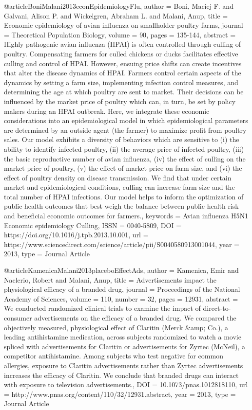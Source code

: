 @article{BoniMalani2013econEpidemiologyFlu,
   author = {Boni, Maciej F. and Galvani, Alison P. and Wickelgren, Abraham L. and Malani, Anup},
   title = {Economic epidemiology of avian influenza on smallholder poultry farms},
   journal = {Theoretical Population Biology},
   volume = {90},
   pages = {135-144},
   abstract = {Highly pathogenic avian influenza (HPAI) is often controlled through culling of poultry. Compensating farmers for culled chickens or ducks facilitates effective culling and control of HPAI. However, ensuing price shifts can create incentives that alter the disease dynamics of HPAI. Farmers control certain aspects of the dynamics by setting a farm size, implementing infection control measures, and determining the age at which poultry are sent to market. Their decisions can be influenced by the market price of poultry which can, in turn, be set by policy makers during an HPAI outbreak. Here, we integrate these economic considerations into an epidemiological model in which epidemiological parameters are determined by an outside agent (the farmer) to maximize profit from poultry sales. Our model exhibits a diversity of behaviors which are sensitive to (i) the ability to identify infected poultry, (ii) the average price of infected poultry, (iii) the basic reproductive number of avian influenza, (iv) the effect of culling on the market price of poultry, (v) the effect of market price on farm size, and (vi) the effect of poultry density on disease transmission. We find that under certain market and epidemiological conditions, culling can increase farm size and the total number of HPAI infections. Our model helps to inform the optimization of public health outcomes that best weigh the balance between public health risk and beneficial economic outcomes for farmers.},
   keywords = {Avian influenza
H5N1
Economic epidemiology
Culling},
   ISSN = {0040-5809},
   DOI = {https://doi.org/10.1016/j.tpb.2013.10.001},
   url = {https://www.sciencedirect.com/science/article/pii/S0040580913001044},
   year = {2013},
   type = {Journal Article}
}

@article{KamenicaMalani2013placeboEffectAds,
   author = {Kamenica, Emir and Naclerio, Robert and Malani, Anup},
   title = {Advertisements impact the physiological efficacy of a branded drug},
   journal = {Proceedings of the National Academy of Sciences},
   volume = {110},
   number = {32},
   pages = {12931},
   abstract = {We conducted randomized clinical trials to examine the impact of direct-to-consumer advertisements on the efficacy of a branded drug. We compared the objectively measured, physiological effect of Claritin (Merck &amp; Co.), a leading antihistamine medication, across subjects randomized to watch a movie spliced with advertisements for Claritin or advertisements for Zyrtec (McNeil), a competitor antihistamine. Among subjects who test negative for common allergies, exposure to Claritin advertisements rather than Zyrtec advertisements increases the efficacy of Claritin. We conclude that branded drugs can interact with exposure to television advertisements.},
   DOI = {10.1073/pnas.1012818110},
   url = {http://www.pnas.org/content/110/32/12931.abstract},
   year = {2013},
   type = {Journal Article}
}

